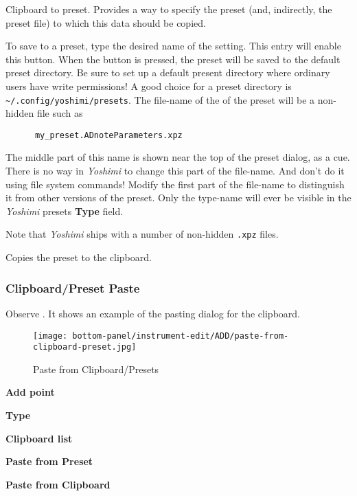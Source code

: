    Clipboard to preset.
   Provides a way to specify the preset (and, indirectly, the preset file)
   to which this data should be copied.

   To save to a preset, type the desired name of the setting.  This entry
   will enable this button.  When the button is pressed, the preset will
   be saved to the default preset directory.
   Be sure to set up a default present directory where ordinary users have write
   permissions!
   A good choice for a preset directory is
   \texttt{\textasciitilde/.config/yoshimi/presets}.
   The file-name of the of the preset will be a non-hidden file such as

   \begin{verbatim}
      my_preset.ADnoteParameters.xpz
   \end{verbatim}

   The middle part of this name is shown near the top of the preset dialog, as
   a cue.
   There is no way in \textsl{Yoshimi} to change this part of the file-name.
   And don't do it using file system commands!  Modify the first part of the
   file-name to distinguish it from other versions of the preset.
   Only the type-name will ever be visible in the \textsl{Yoshimi}
   presets \textbf{Type} field.

   Note that \textsl{Yoshimi} ships with a number of non-hidden \texttt{.xpz}
   files.

   Copies the preset to the clipboard.

\subsubsection{Clipboard/Preset Paste}
\label{subsubsec:clipboard_paste}

   Observe .
   It shows an example of the pasting dialog for the clipboard.

\begin{figure}[H]
   \centering 
   \texttt{[image: bottom-panel/instrument-edit/ADD/paste-from-clipboard-preset.jpg]}
   \caption[Paste from Clipboard]{Paste from Clipboard/Presets}
   \label{fig:paste_to_clipboard} 
\end{figure}

   \begin{enumber}
      \item \textbf{Add point}
      \item \textbf{Type}
      \item \textbf{Clipboard list}
      \item \textbf{Paste from Preset}
      \item \textbf{Paste from Clipboard}
   \end{enumber}

